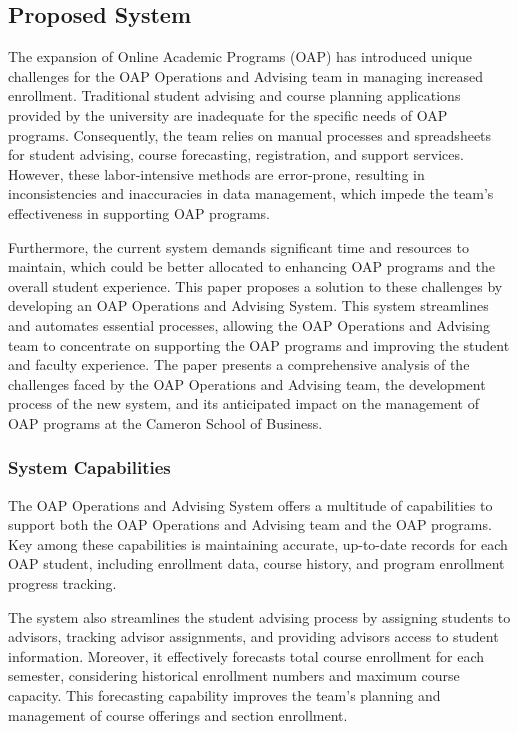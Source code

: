 \documentclass[12pt]{article}
\begin{document}
\subsection{Proposed System}
The expansion of Online Academic Programs (OAP) has introduced unique challenges for the OAP Operations and Advising team in managing increased enrollment. Traditional student advising and course planning applications provided by the university are inadequate for the specific needs of OAP programs. Consequently, the team relies on manual processes and spreadsheets for student advising, course forecasting, registration, and support services. However, these labor-intensive methods are error-prone, resulting in inconsistencies and inaccuracies in data management, which impede the team's effectiveness in supporting OAP programs.

Furthermore, the current system demands significant time and resources to maintain, which could be better allocated to enhancing OAP programs and the overall student experience. This paper proposes a solution to these challenges by developing an OAP Operations and Advising System. This system streamlines and automates essential processes, allowing the OAP Operations and Advising team to concentrate on supporting the OAP programs and improving the student and faculty experience. The paper presents a comprehensive analysis of the challenges faced by the OAP Operations and Advising team, the development process of the new system, and its anticipated impact on the management of OAP programs at the Cameron School of Business.

\subsubsection{System Capabilities} 
The OAP Operations and Advising System offers a multitude of capabilities to support both the OAP Operations and Advising team and the OAP programs. Key among these capabilities is maintaining accurate, up-to-date records for each OAP student, including enrollment data, course history, and program enrollment progress tracking.

The system also streamlines the student advising process by assigning students to advisors, tracking advisor assignments, and providing advisors access to student information. Moreover, it effectively forecasts total course enrollment for each semester, considering historical enrollment numbers and maximum course capacity. This forecasting capability improves the team's planning and management of course offerings and section enrollment.
\end{document}
